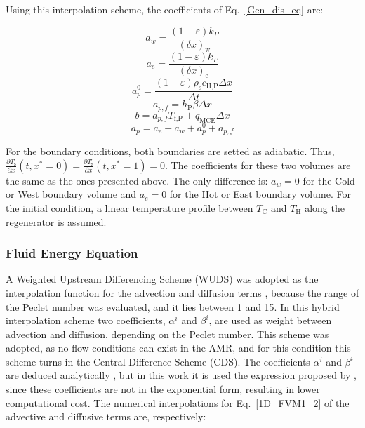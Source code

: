 \documentclass[review,preprint,12pt]{elsarticle}
\begin{document}
Using this interpolation scheme, the coefficients of Eq.~\eqref{Gen_dis_eq} are:

\begin{equation}
a_w = \frac{(1-\varepsilon)k_P}{(\delta x)_\textrm{w}} \nonumber
\end{equation}
\begin{equation}
a_e = \frac{(1-\varepsilon)k_P}{(\delta x)_\textrm{e}} \nonumber
\end{equation}
\begin{equation}
a_p^0 = \frac{(1-\varepsilon)\rho_\textrm{s} c_\textrm{H,P} \Delta x}{\Delta t} \nonumber
\end{equation}
\begin{equation}
a_{p,f} = h_\textrm{P}\beta \Delta x \nonumber
\end{equation}
\begin{equation}
b = a_{p,f}T_\textrm{f,P}+\dot{q}_\textrm{MCE}\Delta x \nonumber
\end{equation}
\begin{equation}
a_p = a_e + a_w + a_p^0 + a_{p,f} \nonumber
\end{equation}

For the boundary conditions, both boundaries are setted as adiabatic. Thus, $\frac{\partial T_\textrm{s}}{\partial x}(t,x^*=0)=\frac{\partial T_\textrm{s}}{\partial x}(t,x^*=1)=0$. The coefficients for these two volumes are the same as the ones presented above. The only difference is: $a_{w} = 0$ for the Cold or West boundary volume and $a_{e} = 0$ for the Hot or East boundary volume. For the initial condition, a linear temperature profile between $T_\textrm{C}$ and $T_\textrm{H}$ along the regenerator is assumed.


\subsubsection{Fluid Energy Equation}
\label{sec:disc-fluid}

A Weighted Upstream Differencing Scheme (WUDS) was adopted as the interpolation function for the advection and diffusion terms \cite{Maliska2004}, because the range of the Peclet number was evaluated, and it lies between 1 and 15. In this hybrid interpolation scheme two coefficients, $\alpha^{i}$ and $\beta^{i}$, are used as weight between advection and diffusion, depending on the Peclet number. This scheme was adopted, as no-flow conditions can exist in the AMR, and for this condition this scheme turns in the Central Difference Scheme (CDS). The coefficients $\alpha^{i}$ and $\beta^{i}$ are deduced analytically \cite{Maliska2004}, but in this work it is used the expression proposed by \cite{Raithby}, since these coefficients are not in the exponential form, resulting in lower computational cost. The numerical interpolations for Eq.~\eqref{1D_FVM1_2} of the advective and diffusive terms are, respectively:
\end{document}
